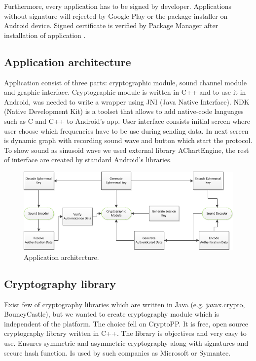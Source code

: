 \documentclass[11pt,titlepage]{article}
\theoremstyle{plain}
\begin{document}
\vspace{5mm}

Furthermore, every application has to be signed by developer. Applications without signature will rejected by Google Play or the package installer on Android device. Signed certificate is verified by Package Manager after installation of application \cite{android_sec}.

\subsection{Application architecture}

Application consist of three parts: cryptographic module, sound channel module and graphic interface. Cryptographic module is written in C++ and to use it in Android, was needed to write a wrapper using JNI (Java Native Interface). NDK (Native Development Kit) is a toolset that allows to add native-code languages such as C and C++ to Android's app. User interface consists initial screen where user choose which frequencies have to be use during sending data. In next screen is dynamic graph with recording sound wave and button which start the protocol. To show sound as sinusoid wave we used external library AChartEngine, the rest of interface are created by standard Android's libraries.

\vspace{5mm}

\begin{figure}[H]
	\centering
	\includegraphics[width=1\textwidth]{img/architecture}
	\caption{Application architecture.}
\end{figure}

\subsection{Cryptography library}

Exist few of cryptography libraries which are written in Java (e.g. javax.crypto, BouncyCastle), but we wanted to create cryptography module which is independent of the platform. The choice fell on CryptoPP. It is free, open source cryptography library written in C++. The library is objectives and very easy to use. Ensures symmetric and asymmetric cryptography along with signatures and secure hash function. Is used by such companies as Microsoft or Symantec.
\end{document}

